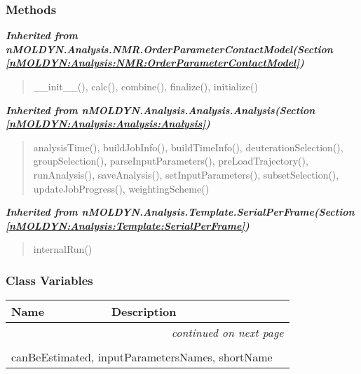 
  \subsubsection{Methods}


\large{\textbf{\textit{Inherited from nMOLDYN.Analysis.NMR.OrderParameterContactModel\textit{(Section \ref{nMOLDYN:Analysis:NMR:OrderParameterContactModel})}}}}

\begin{quote}
\_\_init\_\_(), calc(), combine(), finalize(), initialize()
\end{quote}

\large{\textbf{\textit{Inherited from nMOLDYN.Analysis.Analysis.Analysis\textit{(Section \ref{nMOLDYN:Analysis:Analysis:Analysis})}}}}

\begin{quote}
analysisTime(), buildJobInfo(), buildTimeInfo(), deuterationSelection(), groupSelection(), parseInputParameters(), preLoadTrajectory(), runAnalysis(), saveAnalysis(), setInputParameters(), subsetSelection(), updateJobProgress(), weightingScheme()
\end{quote}

\large{\textbf{\textit{Inherited from nMOLDYN.Analysis.Template.SerialPerFrame\textit{(Section \ref{nMOLDYN:Analysis:Template:SerialPerFrame})}}}}

\begin{quote}
internalRun()
\end{quote}


  \subsubsection{Class Variables}

    \vspace{-1cm}
\hspace{\varindent}\begin{longtable}{|p{\varnamewidth}|p{\vardescrwidth}|l}
\cline{1-2}
\cline{1-2} \centering \textbf{Name} & \centering \textbf{Description}& \\
\cline{1-2}
\endhead\cline{1-2}\multicolumn{3}{r}{\small\textit{continued on next page}}\\\endfoot\cline{1-2}
\endlastfoot\multicolumn{2}{|l|}{\textit{Inherited from nMOLDYN.Analysis.NMR.OrderParameterContactModel \textit{(Section \ref{nMOLDYN:Analysis:NMR:OrderParameterContactModel})}}}\\
\multicolumn{2}{|p{\varwidth}|}{\raggedright canBeEstimated, inputParametersNames, shortName}\\
\cline{1-2}
\end{longtable}


